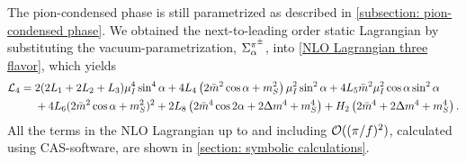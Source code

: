 The pion-condensed phase is still parametrized as described in \autoref{subsection: pion-condensed phase}.
We obtained the next-to-leading order static Lagrangian by substituting the vacuum-parametrization, $\Sigma^{\pi^\pm}_\alpha$, into \autoref{NLO Lagrangian three flavor}, which yields
%
\begin{align}
    \label{bare static nlo lagrangian}
    \nonumber
    \mathcal{L}_4
    = {}&
    2(2L_1 + 2L_2 + L_3) \mu_I^4 \sin^4\alpha
    + 4  L_4 \left( 2 \bar m^2 \cos\alpha + m_S^2 \right) \mu_I^2\sin^2\alpha
    + 4 L_5 \bar m^2 \mu_I^2 \cos\alpha \sin^2 \alpha 
    \\ & 
    + 4 L_6 (2\bar m^2\cos\alpha + m_S^2)^2
    + 2 L_8 \left(2 \bar m^4 \cos2\alpha + 2 \Delta m^4 + m_S^4\right)
    + H_2 \left(2\bar m^4 + 2\Delta m^4 + m_S^4 \right).
\end{align}
%
All the terms in the NLO Lagrangian up to and including $\mathcal O((\pi/f)^2)$, calculated using CAS-software, are shown in \autoref{section: symbolic calculations}.

